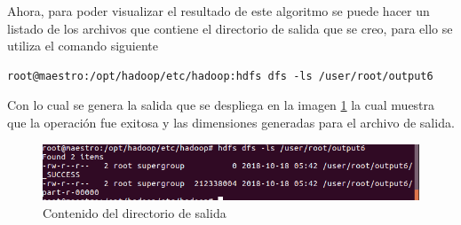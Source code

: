 Ahora, para poder visualizar el resultado de este algoritmo se puede hacer un listado de los archivos que contiene el directorio de salida
que se creo, para ello se utiliza el comando siguiente
\begin{verbatim}
root@maestro:/opt/hadoop/etc/hadoop:hdfs dfs -ls /user/root/output6
\end{verbatim}
Con lo cual se genera la salida que se despliega en la imagen \ref{fig:redi8} la cual muestra que la operación fue exitosa y las dimensiones generadas para el archivo de salida.
\begin{figure}[!htbp]
	\hypertarget{fig:redi8}{\hspace{1pt}}
	\begin{center}
		\includegraphics[width=.9\textwidth]{capitulo4/images/ejemplo9.png}
		\caption{Contenido del directorio de salida}
		\label{fig:redi8}
	\end{center}
\end{figure}

